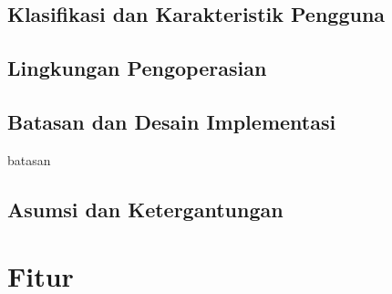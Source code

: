 \documentclass[12pt, a4paper, oneside]{book}
\begin{document}
	\section{Klasifikasi dan Karakteristik Pengguna}
		
	\section{Lingkungan Pengoperasian}
		
	\section{Batasan dan Desain Implementasi}
		 {batasan}
	\section{Asumsi dan Ketergantungan}
		
	\pagebreak
	\chapter{Fitur}	
	
\end{document}
